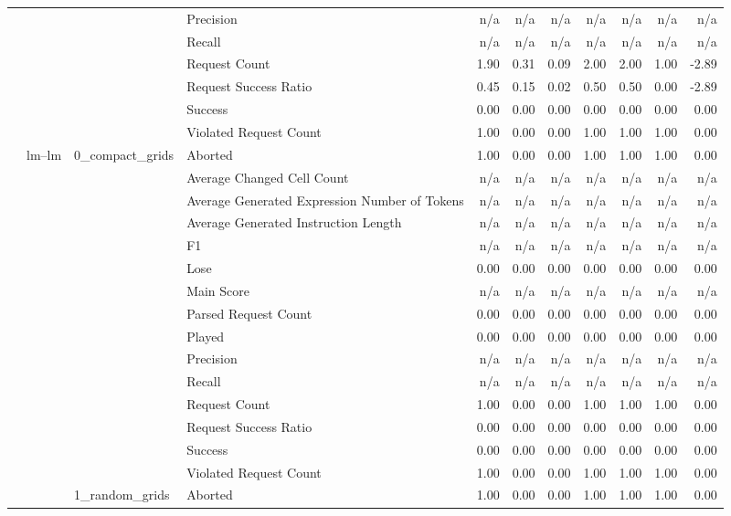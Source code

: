 \begin{tabular}{llllrrrrrrr}
 &  &  & Precision & n/a & n/a & n/a & n/a & n/a & n/a & n/a \\
 &  &  & Recall & n/a & n/a & n/a & n/a & n/a & n/a & n/a \\
 &  &  & Request Count & 1.90 & 0.31 & 0.09 & 2.00 & 2.00 & 1.00 & -2.89 \\
 &  &  & Request Success Ratio & 0.45 & 0.15 & 0.02 & 0.50 & 0.50 & 0.00 & -2.89 \\
 &  &  & Success & 0.00 & 0.00 & 0.00 & 0.00 & 0.00 & 0.00 & 0.00 \\
 &  &  & Violated Request Count & 1.00 & 0.00 & 0.00 & 1.00 & 1.00 & 1.00 & 0.00 \\
\cline{2-11} \cline{3-11}
 & \multirow[t]{30}{*}{lm--lm} & \multirow[t]{15}{*}{0_compact_grids} & Aborted & 1.00 & 0.00 & 0.00 & 1.00 & 1.00 & 1.00 & 0.00 \\
 &  &  & Average Changed Cell Count & n/a & n/a & n/a & n/a & n/a & n/a & n/a \\
 &  &  & Average Generated Expression Number of Tokens & n/a & n/a & n/a & n/a & n/a & n/a & n/a \\
 &  &  & Average Generated Instruction Length & n/a & n/a & n/a & n/a & n/a & n/a & n/a \\
 &  &  & F1 & n/a & n/a & n/a & n/a & n/a & n/a & n/a \\
 &  &  & Lose & 0.00 & 0.00 & 0.00 & 0.00 & 0.00 & 0.00 & 0.00 \\
 &  &  & Main Score & n/a & n/a & n/a & n/a & n/a & n/a & n/a \\
 &  &  & Parsed Request Count & 0.00 & 0.00 & 0.00 & 0.00 & 0.00 & 0.00 & 0.00 \\
 &  &  & Played & 0.00 & 0.00 & 0.00 & 0.00 & 0.00 & 0.00 & 0.00 \\
 &  &  & Precision & n/a & n/a & n/a & n/a & n/a & n/a & n/a \\
 &  &  & Recall & n/a & n/a & n/a & n/a & n/a & n/a & n/a \\
 &  &  & Request Count & 1.00 & 0.00 & 0.00 & 1.00 & 1.00 & 1.00 & 0.00 \\
 &  &  & Request Success Ratio & 0.00 & 0.00 & 0.00 & 0.00 & 0.00 & 0.00 & 0.00 \\
 &  &  & Success & 0.00 & 0.00 & 0.00 & 0.00 & 0.00 & 0.00 & 0.00 \\
 &  &  & Violated Request Count & 1.00 & 0.00 & 0.00 & 1.00 & 1.00 & 1.00 & 0.00 \\
\cline{3-11}
 &  & \multirow[t]{15}{*}{1_random_grids} & Aborted & 1.00 & 0.00 & 0.00 & 1.00 & 1.00 & 1.00 & 0.00 \\

\end{tabular}
